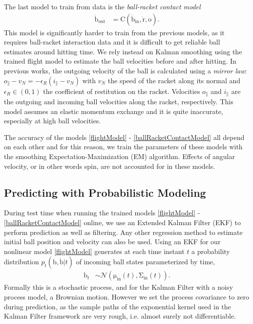 \documentclass[letterpaper, 10 pt, conference]{ieeeconf}
\newcommand{\boldvec}[1]{\boldsymbol{\mathrm{#1}}}
\let\vec\boldvec
\newcommand{\ball}{\vec{b}} %
\newcommand{\contact}{\vec{C}} %
\newcommand{\racket}{\vec{r}} %
\newcommand{\orient}{\vec{o}} %
\begin{document}

The last model to train from data is the \emph{ball-racket contact model} 
%
\begin{align}
\dot{\ball}_{\mathrm{out}} &= \contact(\dot{\ball}_{\mathrm{in}},\dot{\racket},\orient).
\label{ballRacketContactModel}
\end{align}
%
\noindent This model is significantly harder to train from the previous models, as it requires ball-racket interaction data and it is difficult to get reliable ball estimates around hitting time. We rely instead on Kalman smoothing using the trained flight model to estimate the ball velocities before and after hitting. In previous works, the outgoing velocity of the ball is calculated using a \emph{mirror law}: $o_{\parallel} - v_N = -\epsilon_{R} (i_{\parallel} - v_N)$ with $v_N$ the speed of the racket along its normal and $\epsilon_{R} \in (0,1)$ the coefficient of restitution on the racket. Velocities $o_{\parallel}$ and $i_{\parallel}$ are the outgoing and incoming ball velocities along the racket, respectively. This model assumes an elastic momentum exchange and it is quite inaccurate, especially at high ball velocities.

The accuracy of the models \eqref{flightModel} - \eqref{ballRacketContactModel} all depend on each other and for this reason, we train the parameters of these models with the smoothing Expectation-Maximization (EM) algorithm. Effects of angular velocity, or in other words spin, are not accounted for in these models.

\subsection{Predicting with Probabilistic Modeling}
 
During test time when running the trained models \eqref{flightModel} - \eqref{ballRacketContactModel} online, we use an Extended Kalman Filter (EKF) to perform prediction as well as filtering. Any other regression method to estimate initial ball position and velocity can also be used.
Using an EKF for our nonlinear model \eqref{flightModel} generates at each time instant $t$ a probability distribution $p_t(\ball,\dot{\ball}|t)$ of incoming ball states parameterized by time, 
%
\begin{align}
\ball_t &\sim \mathcal{N}(\vec{\mu}_{\textrm{in}}(t),\vec{\Sigma}_{\textrm{in}}(t)). 
\end{align}
%
%
\noindent Formally this is a stochastic process, and for the Kalman Filter with a noisy process model, a Brownian motion. However we set the process covariance to zero during prediction, as the sample paths of the exponential kernel used in the Kalman Filter framework are very rough, i.e. almost surely not differentiable.
\end{document}
